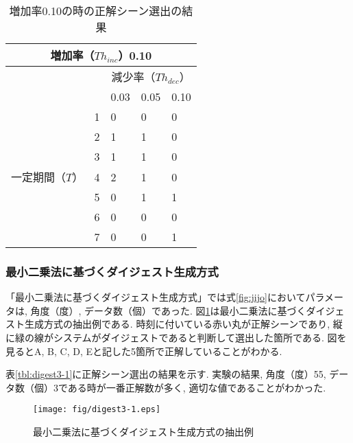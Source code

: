 \begin{table}[h]
  \caption{増加率0.10の時の正解シーン選出の結果}
  \label{tbl:digest2-2}
  \centering
      {\small
        \begin{tabular}{|l|l||l|l|l|} \hline
          \multicolumn{5}{|c|}{増加率（$Th_{inc}$）0.10} \\ \hline
          & & \multicolumn{3}{c|}{減少率（$Th_{dec}$）} \\ \hline
          & & 0.03 & 0.05 & 0.10 \\ \hline \hline \cline{2-5}
          & 1 & 0 & 0 & 0 \\ \cline{2-5}
          & 2 & 1 & 1 & 0 \\ \cline{2-5}
          & 3 & 1 & 1 & 0 \\ \cline{2-5}
          一定期間（$T$）& 4 & 2 & 1 & 0 \\ \cline{2-5}
          & 5 & 0 & 1 & 1 \\ \cline{2-5}
          & 6 & 0 & 0 & 0 \\ \cline{2-5}
          & 7 & 0 & 0 & 1 \\ \cline{2-5}
          \hline
        \end{tabular}
      }
\end{table}

\newpage

\subsubsection{最小二乗法に基づくダイジェスト生成方式}
「最小二乗法に基づくダイジェスト生成方式」では式\ref{fig:jijo}においてパラメータは, 角度（度）, データ数（個）であった. 図\ref{fig:digest3-1}は最小二乗法に基づくダイジェスト生成方式の抽出例である. 時刻に付いている赤い丸が正解シーンであり, 縦に緑の線がシステムがダイジェストであると判断して選出した箇所である. 図を見るとA, B, C, D, Eと記した5箇所で正解していることがわかる.

表\ref{tbl:digest3-1}に正解シーン選出の結果を示す. 実験の結果, 角度（度）55, データ数（個）3である時が一番正解数が多く, 適切な値であることがわかった.

\begin{figure}[h]
  \centering
  \texttt{[image: fig/digest3-1.eps]}
  \caption{最小二乗法に基づくダイジェスト生成方式の抽出例}
  \label{fig:digest3-1}
\end{figure}

